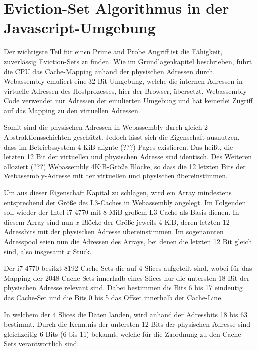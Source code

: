 \section{Eviction-Set Algorithmus in der Javascript-Umgebung}
Der wichtigste Teil für einen Prime and Probe Angriff ist die Fähigkeit, zuverlässig Eviction-Sets zu finden. Wie im Grundlagenkapitel beschrieben, führt die CPU das Cache-Mapping anhand der physischen Adressen durch. Webassembly emuliert eine 32 Bit Umgebung, welche die internen Adressen in virtuelle Adressen des Hostprozesses, hier der Browser, übersetzt. 
Webassembly-Code verwendet nur Adressen der emulierten Umgebung und hat keinerlei Zugriff auf das Mapping zu den virtuellen Adressen. 

Somit sind die physischen Adressen in Webassembly durch gleich 2 Abstraktionsschichten geschützt. 
Jedoch lässt sich die Eigenschaft ausnutzen, dass im Betriebssystem 4-KiB alignte (???) Pages existieren. 
Das heißt, die letzten 12 Bit der virtuellen und physischen Adresse sind identisch. 
Des Weiteren alloziert (???) Webassembly 4KiB-Größe Blöcke, so dass die 12 letzten Bits der Webassembly-Adresse mit der virtuellen und physischen übereinstimmen.

Um aus dieser Eigenschaft Kapital zu schlagen, wird ein Array mindestens entsprechend der Größe des L3-Caches in Webassembly angelegt. Im Folgenden soll wieder der Intel i7-4770 mit 8 MiB großem L3-Cache als Basis dienen. In diesem Array sind nun $x$ Blöcke der Größe jeweils 4 KiB, deren letzten 12 Adressbits mit der physischen Adresse übereinstimmen. Im sogenannten Adresspool seien nun die Adressen des Arrays, bei denen die letzten 12 Bit gleich sind, also insgesamt $x$ Stück.

Der i7-4770 besitzt 8192 Cache-Sets die auf 4 Slices aufgeteilt sind, wobei für das Mapping der 2048 Cache-Sets innerhalb eines Slices nur die untersten 18 Bit der physischen Adresse relevant sind. Dabei bestimmen die Bits 6 bis 17 eindeutig das Cache-Set und die Bits 0 bis 5 das Offset innerhalb der Cache-Line.

In welchem der 4 Slices die Daten landen, wird anhand der Adressbits 18 bis 63 bestimmt.
Durch die Kenntnis der untersten 12 Bits der physischen Adresse sind gleichzeitig 6 Bits (6 bis 11) bekannt, welche für die Zuordnung zu den Cache-Sets verantwortlich sind.


